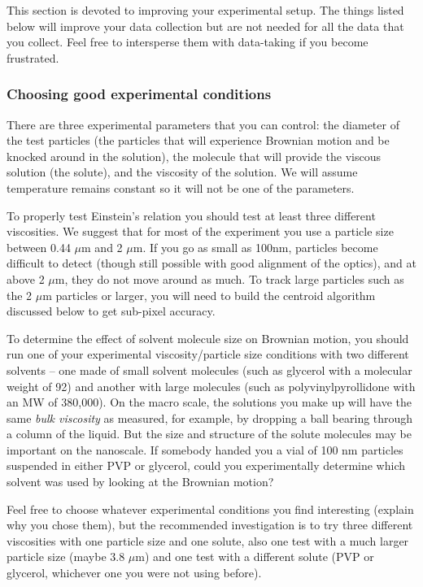 \documentclass{../lab}
\begin{document}
This section is devoted to improving your experimental setup. The things listed below will improve your data collection but are not needed for all the data that you collect. Feel free to intersperse them with data-taking if you become frustrated.

\subsubsection{Choosing good experimental conditions}

There are three experimental parameters that you can control: the diameter of the test particles (the particles that will experience Brownian motion and be knocked around in the solution), the molecule that will provide the viscous solution (the solute), and the viscosity of the solution. We will assume temperature remains constant so it will not be one of the parameters.

To properly test Einstein's relation you should test at least three different viscosities. We suggest that for most of the experiment you use a particle size between 0.44 $\mu$m and 2 $\mu$m. If you go as small as 100nm, particles become difficult to detect (though still possible with good alignment of the optics), and at above 2 $\mu$m, they do not move around as much. To track large particles such as the 2 $\mu$m particles or larger, you will need to build the centroid algorithm discussed below to get sub-pixel accuracy.

To determine the effect of solvent molecule size on Brownian motion, you should run one of your experimental viscosity/particle size conditions with two different solvents – one made of small solvent molecules (such as glycerol with a molecular weight of 92) and another with large molecules (such as polyvinylpyrollidone with an MW of 380,000). On the macro scale, the solutions you make up will have the same \emph{bulk viscosity} as measured, for example, by dropping a ball bearing through a column of the liquid. But the size and structure of the solute molecules may be important on the nanoscale. If somebody handed you a vial of 100 nm particles suspended in either PVP or glycerol, could you experimentally determine which solvent was used by looking at the Brownian motion?

Feel free to choose whatever experimental conditions you find interesting (explain why you chose them), but the recommended investigation is to try three different viscosities with one particle size and one solute, also one test with a much larger particle size (maybe 3.8 $\mu$m) and one test with a different solute (PVP or glycerol, whichever one you were not using before).
\end{document}
